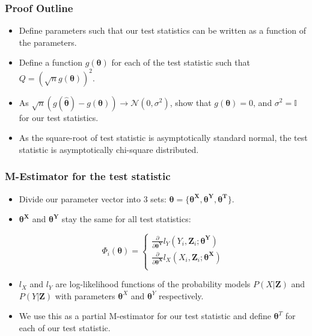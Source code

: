 \documentclass{beamer}
\begin{document}
\begin{frame}
	\frametitle{Proof Outline}
	\begin{itemize}
		\item Define parameters such that our test statistics can be written as a function of the parameters.
		\item Define a function $ g(\bm{\theta}) $ for each of the test statistic such that $ Q = (\sqrt{n}g(\bm{\theta}))^2 $.
		\item As $ \sqrt{n}(g(\hat{\bm{\theta}}) - g(\bm{\theta})) \to \mathcal{N}(0, \sigma^2) $, show that $ g(\bm{\theta}) = 0 $, and $ \sigma^2 = \mathbb{I} $ for our test statistics.
		\item As the square-root of test statistic is asymptotically standard normal, the test statistic is asymptotically chi-square distributed.
	\end{itemize}

\end{frame}

\begin{frame}
	\frametitle{M-Estimator for the test statistic}
	\begin{itemize}
		\item Divide our parameter vector into $ 3 $ sets: $ \bm{\theta} = \{ \bm{\theta^\bm{X}}, \bm{\theta^\bm{Y}}, \bm{\theta^\bm{T}} \} $.
		\item $ \bm{\theta^\bm{X}} $ and $ \bm{\theta^\bm{Y}} $ stay the same for all test
			statistics:

			\begin{equation*}
			\Phi_i(\bm{\theta}) = \begin{cases}
				\frac{\partial}{\partial \bm{\theta}^{\bm{Y}}} l_Y (Y_i, \bm{Z}_i; \bm{\theta^{Y}}) \\
				\frac{\partial}{\partial \bm{\theta}^{\bm{X}}} l_X (X_i, \bm{Z}_i; \bm{\theta^{X}}) \\
				\end{cases}
			\end{equation*}

		\item $ l_X $ and $ l_Y $ are log-likelihood functions of the probability models $ P(X | \bm{Z}) $ and $ P(Y | \bm{Z}) $ with parameters $ \bm{\theta}^X $ and $ \bm{\theta}^Y $ respectively.
		\item We use this as a partial M-estimator for our test statistic and define $ \bm{\theta}^T $ for each of our test statistic.
	\end{itemize}
\end{frame}
\end{document}
